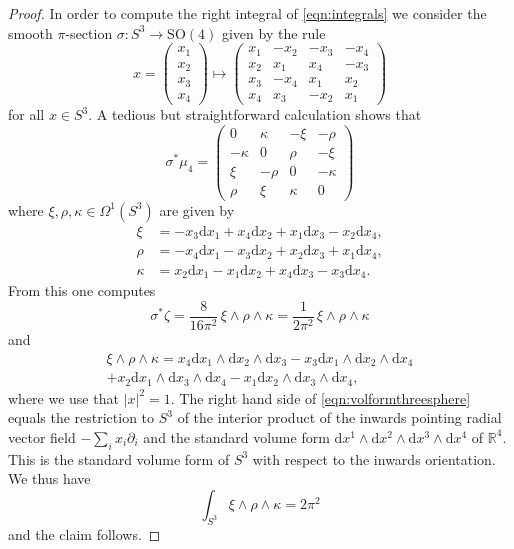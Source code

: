 \documentclass[british,11pt,a4paper]{amsart}
\numberwithin{equation}{section}
\renewcommand*{\d}{\mathrm{d}}
\newcommand*{\R}{\mathbb{R}}
\newcommand{\col}{:}
\numberwithin{theorem}{section}
\theoremstyle{definition}
\theoremstyle{remark}
\begin{document}
\begin{proof}
In order to compute the right integral of \eqref{eqn:integrals} we consider the smooth $\pi$-section $\sigma \col S^3 \to \mathrm{SO}(4)$ given by the rule
\[
x=\begin{pmatrix} x_1 \\ x_2 \\ x_3 \\ x_4 \end{pmatrix} \mapsto \begin{pmatrix} x_1 & -x_2 & -x_3 & -x_4 \\ x_2 & x_1 & x_4 & -x_3 \\ x_3 & -x_4 & x_1 & x_2 \\ x_4 & x_3 & -x_2 & x_1 \end{pmatrix}
\]
for all $x \in S^3$. A tedious but straightforward calculation shows that
\[
\sigma^*\mu_4=\begin{pmatrix} 0 & \kappa & -\xi & -\rho  \\ -\kappa & 0 & \rho & -\xi \\ \xi & -\rho & 0 & -\kappa \\ \rho & \xi & \kappa & 0 \end{pmatrix}
\]
where $\xi,\rho,\kappa \in \Omega^1(S^3)$ are given by
\begin{equation}
\begin{aligned}\label{eqn:leftinvariantforms}
\xi&=-x_3\d x_1+x_4\d x_2+x_1\d x_3-x_2 \d x_4,\\
\rho&=-x_4\d x_1-x_3\d x_2+x_2\d x_3+x_1\d x_4,\\
\kappa&=x_2\d x_1-x_1\d x_2+x_4\d x_3-x_3 \d x_4.
\end{aligned}
\end{equation}
From this one computes
\[
\sigma^*\zeta=\frac{8}{16\pi^2}\,\xi\wedge\rho\wedge\kappa=\frac{1}{2\pi^2}\,\xi\wedge\rho\wedge\kappa
\]
and
\begin{multline}\label{eqn:volformthreesphere}
\xi\wedge\rho\wedge \kappa=x_4\d x_1\wedge \d x_2 \wedge \d x_3-x_3\d x_1\wedge\d x_2\wedge \d x_4\\
+x_2\d x_1\wedge \d x_3\wedge \d x_4-x_1\d x_2\wedge \d x_3 \wedge\d x_4,
\end{multline}
where we use that $|x|^2=1$. The right hand side of \eqref{eqn:volformthreesphere} equals the restriction to $S^3$ of the interior product of the inwards pointing radial vector field $-\sum_{i}x_i\partial_i$ and the standard volume form $\d x^1\wedge\d x^2\wedge \d x^3\wedge \d x^4$ of $\R^4$. This is the standard volume form of $S^3$ with respect to the inwards orientation. We thus have
\begin{equation}\label{eqn:volumethresphere}
\int_{S^3}\xi\wedge \rho\wedge \kappa=2\pi^2
\end{equation}
and the claim follows.
\end{proof}
\end{document}
